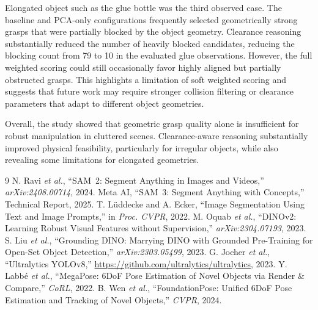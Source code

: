 \documentclass[conference,letterpaper,10pt]{IEEEtran}
\begin{document}
Elongated object such as the glue bottle was the third observed case. The baseline and PCA-only configurations frequently selected geometrically strong grasps that were partially blocked by the object geometry. Clearance reasoning substantially reduced the number of heavily blocked candidates, reducing the blocking count from 79 to 10 in the evaluated glue observations. However, the full weighted scoring could still occasionally favor highly aligned but partially obstructed grasps. This highlights a limitation of soft weighted scoring and suggests that future work may require stronger collision filtering or clearance parameters that adapt to different object geometries.

Overall, the study showed that geometric grasp quality alone is insufficient for robust manipulation in cluttered scenes. Clearance-aware reasoning substantially improved physical feasibility, particularly for irregular objects, while also revealing some limitations for elongated geometries.

\begin{thebibliography}{9}
 N. Ravi \emph{et al.}, ``SAM~2: Segment Anything in
Images and Videos,'' \emph{arXiv:2408.00714}, 2024.
 Meta AI, ``SAM~3: Segment Anything with Concepts,''
Technical Report, 2025.
 T. L\"uddecke and A. Ecker, ``Image Segmentation
Using Text and Image Prompts,'' in \emph{Proc. CVPR}, 2022.
 M. Oquab \emph{et al.}, ``DINOv2: Learning Robust
Visual Features without Supervision,'' \emph{arXiv:2304.07193}, 2023.
 S. Liu \emph{et al.}, ``Grounding DINO: Marrying DINO
with Grounded Pre-Training for Open-Set Object Detection,''
\emph{arXiv:2303.05499}, 2023.
 G. Jocher \emph{et al.}, ``Ultralytics YOLOv8,''
\url{https://github.com/ultralytics/ultralytics}, 2023.
 Y. Labb\'e \emph{et al.}, ``MegaPose: 6DoF Pose
Estimation of Novel Objects via Render \& Compare,''
\emph{CoRL}, 2022.
 B. Wen \emph{et al.}, ``FoundationPose:
Unified 6DoF Pose Estimation and Tracking of Novel Objects,''
\emph{CVPR}, 2024.
\end{thebibliography}
\end{document}
